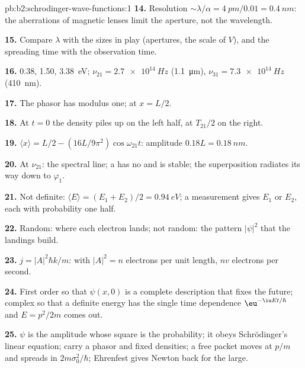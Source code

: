 \begin{solution}{pb:b2:schrodinger-wave-functions:1}
\textbf{14.} Resolution $\sim\lambda/\alpha = \qty{4}{pm}/0.01 = \qty{0.4}{nm}$: the
aberrations of magnetic lenses limit the aperture, not the wavelength.

\textbf{15.} Compare $\lambda$ with the sizes in play (apertures, the
scale of $V$), and the spreading time with the observation time.

\textbf{16.} \qty{0.38}{}, \qty{1.50}{}, \qty{3.38}{eV}; $\nu_{21} = \qty{2.7e14}{Hz}$
(\qty{1.1}{\micro m}), $\nu_{31} = \qty{7.3e14}{Hz}$ (\qty{410}{nm}).

\textbf{17.} The phasor has modulus one; at $x = L/2$.

\textbf{18.} At $t = 0$ the density piles up on the left half, at
$T_{21}/2$ on the right.

\textbf{19.} $\langle x\rangle = L/2 - (16L/9\pi^2)\cos\omega_{21}t$: amplitude
$0.18L = \qty{0.18}{nm}$.

\textbf{20.} At $\nu_{21}$: the spectral line; a  has no
 and is stable; the superposition radiates its way
down to $\varphi_1$.

\textbf{21.} Not definite: $\langle E\rangle = (E_1 + E_2)/2 = \qty{0.94}{eV}$; a
measurement gives $E_1$ or $E_2$, each with probability one half.

\textbf{22.} Random: where each electron lands; not random: the
pattern $|\psi|^2$ that the landings build.

\textbf{23.} $j = |A|^2\hbar k/m$: with $|A|^2 = n$ electrons per unit length,
$nv$ electrons per second.

\textbf{24.} First order so that $\psi(x,0)$ is a complete description
that fixes the future; complex so that a definite energy has the
single time dependence $\eu^{-\iu Et/\hbar}$ and $E = p^2/2m$ comes out.

\textbf{25.} $\psi$ is the amplitude whose square is the probability; it
obeys Schrödinger's linear equation;  carry a
phasor and fixed densities; a free packet moves at $p/m$ and spreads
in $2m\sigma_0^2/\hbar$; Ehrenfest gives Newton back for the large.
\end{solution}
